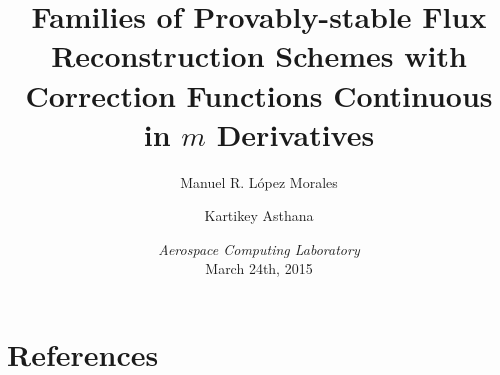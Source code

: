 \documentclass[preprint,12pt]{elsarticle}
\title{Families of Provably-stable Flux Reconstruction Schemes with Correction Functions Continuous in $m$ Derivatives}
\author[mrlm]{Manuel R. L\'opez Morales}
\author[ka]{Kartikey Asthana}
\date{\textsl{Aerospace Computing Laboratory}\\
March 24th, 2015}
\begin{document}


\maketitle













\newpage
\section*{References}


\end{document}
